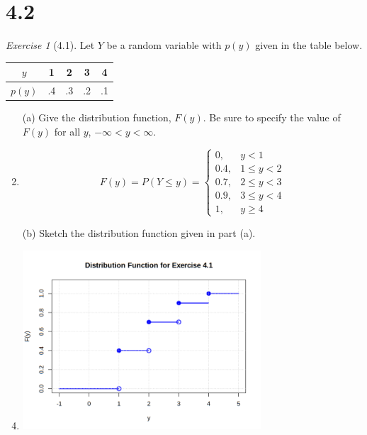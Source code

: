 \documentclass[12pt]{amsart}
\makeatletter
\theoremstyle{remark}
\newtheorem*{exercise}{Exercise}%
\renewenvironment{proof}[1][\proofname]{\par\doublespacing
  \pushQED{\qed}%
  \normalfont \topsep6\p@\@plus6\p@\relax
  \list{}{%
    \settowidth{\leftmargin}{\itshape\proofname:\hskip\labelsep}%
    \setlength{\labelwidth}{0pt}%
    \setlength{\itemindent}{-\leftmargin}%
  }%
  \item[\hskip\labelsep\itshape#1\@addpunct{:}]\ignorespaces
}{%
  \popQED\endlist\@endpefalse
  \singlespacing
}
\theoremstyle{mycomment}
\makeatother
\begin{document}
\section*{4.2}
\begin{exercise}[4.1]
Let $Y$ be a random variable with $p(y)$ given in the table below.
\begin{center}
\begin{tabular}{c|cccc}
$y$ & 1 & 2 & 3 & 4 \\
\hline
$p(y)$ & .4 & .3 & .2 & .1
\end{tabular}
\end{center}

\begin{enumerate}
    \item[(a)] Give the distribution function, $F(y)$. Be sure to specify the value of $F(y)$ for all $y$, $-\infty < y < \infty$.
\begin{proof}[Solution]
 $$F(y) = P(Y \leq y) = \begin{cases}
	0, & y < 1 \\
	0.4, & 1 \leq y < 2 \\
	0.7, & 2 \leq y < 3 \\
	0.9, & 3 \leq y < 4 \\
	1, & y \geq 4
	\end{cases}$$
\end{proof}
    \item[(b)] Sketch the distribution function given in part (a).
\begin{proof}[Solution]
 	\includegraphics[width=0.7\textwidth]{exercise_4_1b.png}
\end{proof}
\end{enumerate} 
\end{exercise}
\end{document}
